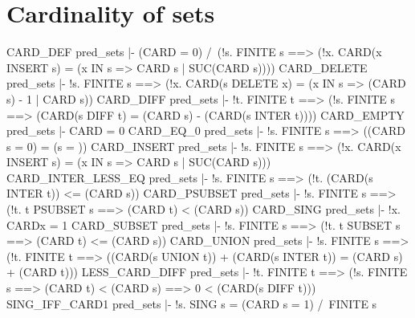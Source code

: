 \section{Cardinality of sets}
\THEOREM CARD\_DEF pred\_sets
|- (CARD{} = 0) /\
   (!s.
     FINITE s ==>
     (!x. CARD(x INSERT s) = (x IN s => CARD s | SUC(CARD s))))
\ENDTHEOREM
\THEOREM CARD\_DELETE pred\_sets
|- !s.
    FINITE s ==>
    (!x. CARD(s DELETE x) = (x IN s => (CARD s) - 1 | CARD s))
\ENDTHEOREM
\THEOREM CARD\_DIFF pred\_sets
|- !t.
    FINITE t ==>
    (!s. FINITE s ==> (CARD(s DIFF t) = (CARD s) - (CARD(s INTER t))))
\ENDTHEOREM
\THEOREM CARD\_EMPTY pred\_sets
|- CARD{} = 0
\ENDTHEOREM
\THEOREM CARD\_EQ\_0 pred\_sets
|- !s. FINITE s ==> ((CARD s = 0) = (s = {}))
\ENDTHEOREM
\THEOREM CARD\_INSERT pred\_sets
|- !s.
    FINITE s ==>
    (!x. CARD(x INSERT s) = (x IN s => CARD s | SUC(CARD s)))
\ENDTHEOREM
\THEOREM CARD\_INTER\_LESS\_EQ pred\_sets
|- !s. FINITE s ==> (!t. (CARD(s INTER t)) <= (CARD s))
\ENDTHEOREM
\THEOREM CARD\_PSUBSET pred\_sets
|- !s. FINITE s ==> (!t. t PSUBSET s ==> (CARD t) < (CARD s))
\ENDTHEOREM
\THEOREM CARD\_SING pred\_sets
|- !x. CARD{x} = 1
\ENDTHEOREM
\THEOREM CARD\_SUBSET pred\_sets
|- !s. FINITE s ==> (!t. t SUBSET s ==> (CARD t) <= (CARD s))
\ENDTHEOREM
\THEOREM CARD\_UNION pred\_sets
|- !s.
    FINITE s ==>
    (!t.
      FINITE t ==>
      ((CARD(s UNION t)) + (CARD(s INTER t)) = (CARD s) + (CARD t)))
\ENDTHEOREM
\THEOREM LESS\_CARD\_DIFF pred\_sets
|- !t.
    FINITE t ==>
    (!s. FINITE s ==> (CARD t) < (CARD s) ==> 0 < (CARD(s DIFF t)))
\ENDTHEOREM
\THEOREM SING\_IFF\_CARD1 pred\_sets
|- !s. SING s = (CARD s = 1) /\ FINITE s
\ENDTHEOREM
